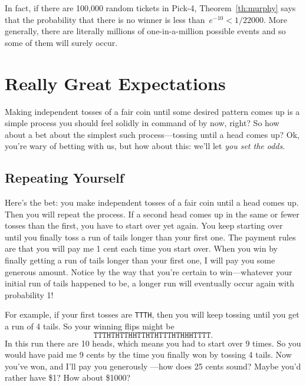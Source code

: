 In fact, if there are 100,000 random tickets in Pick-4,
Theorem~\ref{th:murphy} says that the probability that there is no
winner is less than~$e^{-10} < 1/22000$.  More generally, there are
literally millions of one-in-a-million possible events and so some of
them will surely occur.

\begin{problems}
\practiceproblems
{}

\classproblems
{}

\homeworkproblems
{}

\end{problems}

\section{Really Great Expectations}\label{infinite_expect_sec}

Making independent tosses of a fair coin until some desired pattern
comes up is a simple process you should feel solidly in command of by
now, right?  So how about a bet about the simplest such
process---tossing until a head comes up?  Ok, you're wary of betting
with us, but how about this: we'll let \emph{you set the odds}.

\subsection{Repeating Yourself}\label{infinite_repeat_subsec}
Here's the bet: you make independent tosses of a fair coin until a
head comes up.  Then you will repeat the process.  If a second head
comes up in the same or fewer tosses than the first, you have to start
over yet again.  You keep starting over until you finally toss a run
of tails longer than your first one.  The payment rules are that you
will pay me 1 cent each time you start over.  When you win by finally
getting a run of tails longer than your first one, I will pay you some
generous amount.  Notice by the way that you're certain to
win---whatever your initial run of tails happened to be, a longer run
will eventually occur again with probability 1!

For example, if your first tosses are \texttt{TTTH}, then you will
keep tossing until you get a run of 4 tails.  So your winning
flips might be
\[
\texttt{TTTHTHTTHHTTHTHTTTHTHHHTTTT}.
\]
In this run there are 10 heads, which means you had to start over 9
times.  So you would have paid me 9 cents by the time you finally won
by tossing 4 tails.  Now you've won, and I'll pay you generously
---how does 25 cents sound?  Maybe you'd rather have \$1?  How about
\$1000?


